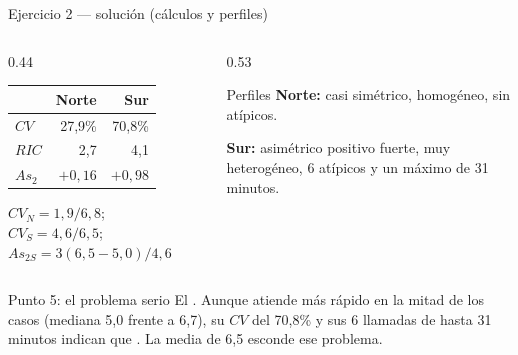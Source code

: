 \documentclass[aspectratio=169,10pt]{beamer}
\begin{document}
\begin{frame}{Ejercicio 2 — solución (cálculos y perfiles)}
  \scriptsize
  \begin{columns}[T,onlytextwidth]
    \begin{column}{0.44\textwidth}
      \centering
      \begin{tabular}{@{}lrr@{}}
        \toprule
        & \textbf{Norte} & \textbf{Sur} \\
        \midrule
        $CV$ & 27{,}9\% & 70{,}8\% \\
        $RIC$ & 2{,}7 & 4{,}1 \\
        $As_2$ & $+0{,}16$ & $+0{,}98$ \\
        \bottomrule
      \end{tabular}
      \vspace{0.1cm}
      {\tiny $CV_N = 1{,}9/6{,}8$; \ $CV_S = 4{,}6/6{,}5$;
      \ $As_{2S} = 3(6{,}5-5{,}0)/4{,}6$}
    \end{column}
    \begin{column}{0.53\textwidth}
      \begin{block}{Perfiles}
        \scriptsize
        \textbf{Norte:} casi simétrico, homogéneo, sin atípicos.

        \vspace{0.1cm}
        \textbf{Sur:} asimétrico positivo fuerte, muy heterogéneo, 6 atípicos
        y un máximo de 31 minutos. 
      \end{block}
    \end{column}
  \end{columns}

  \vspace{0.08cm}
  \begin{alertblock}{Punto 5: el problema serio}
    \tiny
    El . Aunque atiende más rápido en la mitad de los
    casos (mediana 5,0 frente a 6,7), su $CV$ del 70,8\% y sus 6 llamadas de
    hasta 31 minutos indican que . La media de 6,5 esconde ese problema.
  \end{alertblock}
\end{frame}
\end{document}
